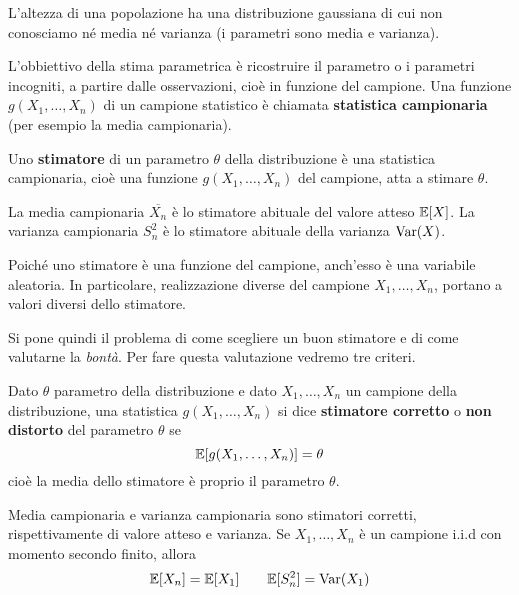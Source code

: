 \begin{example}
	L'altezza di una popolazione ha una distribuzione gaussiana di cui non conosciamo né media né
	varianza (i parametri sono media e varianza).
\end{example}

\label{def: statistica campionaria}
L'obbiettivo della stima parametrica è ricostruire il parametro o i parametri incogniti, a partire
dalle osservazioni, cioè in funzione del campione. Una funzione $g(X_1, \dots, X_n)$ di un campione
statistico è chiamata \textbf{statistica campionaria} (per esempio la media campionaria).

\label{def: stimatore}
Uno \textbf{stimatore} di un parametro $\theta$ della distribuzione è una statistica campionaria,
cioè una funzione $g(X_1, \dots, X_n)$ del campione, atta a stimare $\theta$.

\begin{example}
	La media campionaria $\overline{X_n}$ è lo stimatore abituale del valore atteso $\mathbb{E}[X]$. La
	varianza campionaria $S_n^2$ è lo stimatore abituale della varianza $\operatorname{Var}(X)$.
\end{example}

\begin{observation}
	Poiché uno stimatore è una funzione del campione, anch'esso è una variabile aleatoria. In
	particolare, realizzazione diverse del campione $X_1, \dots, X_n$, portano a valori diversi
	dello stimatore.
\end{observation}

Si pone quindi il problema di come scegliere un buon stimatore e di come valutarne la \emph{bontà}.
Per fare questa valutazione vedremo tre criteri.

\begin{definition}\label{def: stimatore corretto}
	Dato $\theta$ parametro della distribuzione e dato $X_1, \dots, X_n$ un campione della
	distribuzione, una statistica $g(X_1, \dots, X_n)$ si dice \textbf{stimatore corretto} o
	\textbf{non distorto} del parametro $\theta$ se
	\[ \mathbb{E}[g(X_1, \dots, X_n)] = \theta \]
	cioè la media dello stimatore è proprio il parametro $\theta$.
\end{definition}

\begin{proposition}
	Media campionaria e varianza campionaria sono stimatori corretti, rispettivamente di valore
	atteso e varianza. Se $X_1, \dots, X_n$ è un campione i.i.d con momento secondo finito, allora
	\[ \mathbb{E}[X_n] = \mathbb{E}[X_1] \quad \quad \mathbb{E}[S_n^2] = \operatorname{Var}(X_1) \]
\end{proposition}

